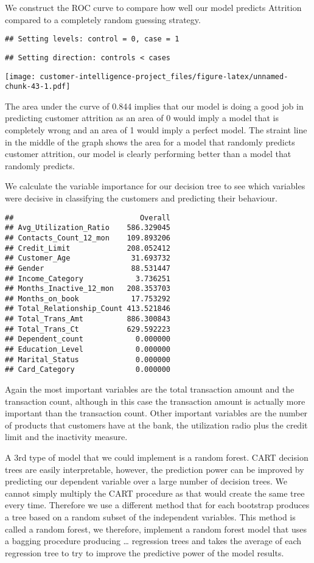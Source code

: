 \documentclass[
]{article}
\begin{document}
We construct the ROC curve to compare how well our model predicts
Attrition compared to a completely random guessing strategy.

\begin{verbatim}
## Setting levels: control = 0, case = 1
\end{verbatim}

\begin{verbatim}
## Setting direction: controls < cases
\end{verbatim}

\texttt{[image: customer-intelligence-project\_files/figure-latex/unnamed-chunk-43-1.pdf]}

The area under the curve of 0.844 implies that our model is doing a good
job in predicting customer attrition as an area of 0 would imply a model
that is completely wrong and an area of 1 would imply a perfect model.
The straint line in the middle of the graph shows the area for a model
that randomly predicts customer attrition, our model is clearly
performing better than a model that randomly predicts.

We calculate the variable importance for our decision tree to see which
variables were decisive in classifying the customers and predicting
their behaviour.

\begin{verbatim}
##                             Overall
## Avg_Utilization_Ratio    586.329045
## Contacts_Count_12_mon    109.893206
## Credit_Limit             208.052412
## Customer_Age              31.693732
## Gender                    88.531447
## Income_Category            3.736251
## Months_Inactive_12_mon   208.353703
## Months_on_book            17.753292
## Total_Relationship_Count 413.521846
## Total_Trans_Amt          886.300843
## Total_Trans_Ct           629.592223
## Dependent_count            0.000000
## Education_Level            0.000000
## Marital_Status             0.000000
## Card_Category              0.000000
\end{verbatim}

Again the most important variables are the total transaction amount and
the transaction count, although in this case the transaction amount is
actually more important than the transaction count. Other important
variables are the number of products that customers have at the bank,
the utilization radio plus the credit limit and the inactivity measure.

A 3rd type of model that we could implement is a random forest. CART
decision trees are easily interpretable, however, the prediction power
can be improved by predicting our dependent variable over a large number
of decision trees. We cannot simply multiply the CART procedure as that
would create the same tree every time. Therefore we use a different
method that for each bootstrap produces a tree based on a random subset
of the independent variables. This method is called a random forest, we
therefore, implement a random forest model that uses a bagging procedure
producing \ldots{} regression trees and takes the average of each
regression tree to try to improve the predictive power of the model
results.
\end{document}
